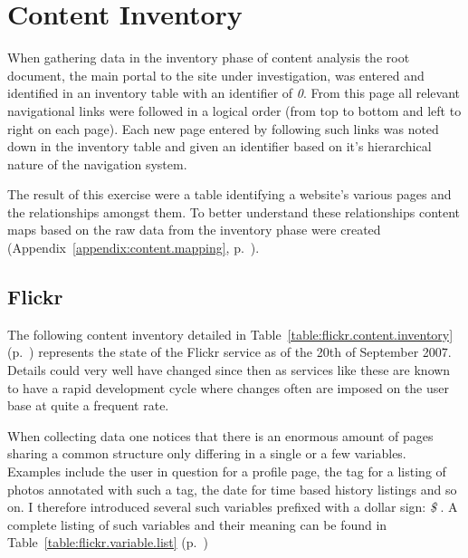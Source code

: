 \chapter{Content Inventory}

When gathering data in the inventory phase of content analysis the root
document, the main portal to the site under investigation, was entered and
identified in an inventory table with an identifier of \emph{0}. From this
page all relevant navigational links were followed in a logical order (from
top to bottom and left to right on each page). Each new page entered by
following such links was noted down in the inventory table and given an
identifier based on it's hierarchical nature of the navigation system.

The result of this exercise were a table identifying a website's various pages
and the relationships amongst them. To better understand these relationships
content maps based on the raw data from the inventory phase were created
(Appendix~\ref{appendix:content.mapping},
p.~\pageref{appendix:content.mapping}).

\label{appendix:content.inventory}

\section{Flickr}

The following content inventory detailed in
Table~\ref{table:flickr.content.inventory}
(p.~\pageref{table:flickr.content.inventory})
represents the state of the Flickr service as of the 20th of September 2007.
Details could very well have changed since then as
services like these are known to have a rapid development cycle
where changes often are imposed on the user base at quite
a frequent rate.

When collecting data one notices that there is an enormous amount of pages
sharing a common structure only differing in a single or a few variables.
Examples include the user in question for a profile page, the tag for a
listing of photos annotated with such a tag, the date for time based history
listings and so on. I therefore introduced several such variables prefixed
with a dollar sign: \emph{\$}%
.
A complete listing of such variables and their meaning can be found in
Table~\ref{table:flickr.variable.list}
(p.~\pageref{table:flickr.variable.list})

